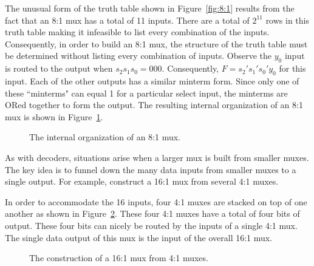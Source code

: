 The unusual form of the truth table shown in Figure~\ref{fig:8:1}
results from the fact that an 8:1 mux has a total of 11 
inputs.  There are a total of $2^{11}$ rows in this truth table
making it infeasible to list every combination of the inputs.
Consequently, in order to build an 8:1 mux, the structure of the truth table 
must be determined without
listing every combination of inputs.  Observe the $y_0$ input is routed 
to the output when 
$s_2 s_1 s_0 = 000$.  Consequently, $F=s_2' s_1' s_0' y_0$
for this input.  Each of the other outputs has a similar
minterm form.  Since only one of these ``minterms" can equal
1 for a particular select input, the minterms are ORed
together to form the output. The resulting internal 
organization of an 8:1 mux is shown in Figure~\ref{fig:8:1Guts}.

\begin{figure}[ht]
\caption{The internal organization of an 8:1 mux.}
\label{fig:8:1Guts}
\end{figure}

As with decoders, situations arise when a larger
mux is built from smaller muxes.  The key idea is to funnel down the many data 
inputs from smaller muxes to a single output.  For example, construct 
a 16:1 mux from several 4:1 muxes.  

In order to accommodate the 16 inputs, four 4:1 muxes are stacked
on top of one another as shown in Figure~\ref{fig:BigMux}.  These
four 4:1 muxes have a total of four bits of output.  These four bits
can nicely be routed by the inputs of a single 4:1 mux.  The
single data output of this mux is the input of the overall 16:1 mux.

\begin{figure}[ht]
\caption{The construction of a 16:1 mux from 4:1 muxes.}
\label{fig:BigMux}
\end{figure}

